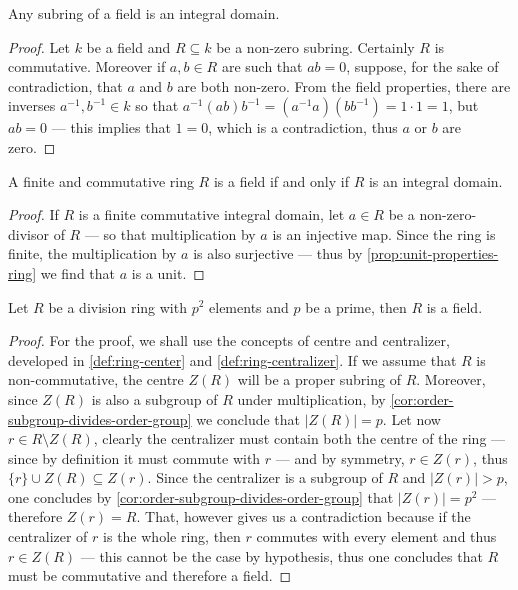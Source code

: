 %
\begin{proposition}
    \label{prop:subring-field-is-integral-domain}
    Any subring of a field is an integral domain.
\end{proposition}
%

%
\begin{proof}
    Let \(k\) be a field and \(R \subseteq k\) be a non-zero subring. Certainly
    \(R\) is commutative. Moreover if \(a, b \in R\) are such that \(a b = 0\),
    suppose, for the sake of contradiction, that \(a\) and \(b\) are both
    non-zero. From the field properties, there are inverses \(a^{-1}, b^{-1} \in k\)
    so that \(a^{-1}(a b) b^{-1} = (a^{-1} a) (b b^{-1}) = 1 \cdot 1 = 1\), but \(a
    b = 0\) --- this implies that \(1 = 0\), which is a contradiction, thus \(a\) or
    \(b\) are zero.
\end{proof}
%

%
\begin{proposition}
    \label{prop:commutative-field-iff-integral-domain}
    A finite and commutative ring \(R\) is a field if and only if \(R\) is an
    integral domain.
\end{proposition}
%

%
\begin{proof}
    If \(R\) is a finite commutative integral domain, let \(a \in R\) be a
    non-zero-divisor of \(R\) --- so that multiplication by \(a\) is an injective
    map. Since the ring is finite, the multiplication by \(a\) is also surjective
    --- thus by \cref{prop:unit-properties-ring} we find that \(a\) is a unit.
\end{proof}
%

%
\begin{proposition}
    \label{prop:division-ring-p2-elements-commutative}
    Let \(R\) be a division ring with \(p^2\) elements and \(p\) be a prime,
    then \(R\) is a field.
\end{proposition}
%

%
\begin{proof}
    For the proof, we shall use the concepts of centre and centralizer, developed in
    \cref{def:ring-center} and \cref{def:ring-centralizer}. If we assume that \(R\)
    is non-commutative, the centre \(Z(R)\) will be a proper subring of
    \(R\). Moreover, since \(Z(R)\) is also a subgroup of \(R\) under
    multiplication, by \cref{cor:order-subgroup-divides-order-group} we conclude
    that \(|Z(R)| = p\). Let now \(r \in R \setminus Z(R)\), clearly the centralizer
    must contain both the centre of the ring --- since by definition it must commute
    with \(r\) --- and by symmetry, \(r \in Z(r)\), thus
    \(\{r\} \cup Z(R) \subseteq Z(r)\). Since the centralizer is a subgroup of \(R\)
    and \(|Z(r)| > p\), one concludes by
    \cref{cor:order-subgroup-divides-order-group} that \(|Z(r)| = p^2\) ---
    therefore \(Z(r) = R\). That, however gives us a contradiction because if the
    centralizer of \(r\) is the whole ring, then \(r\) commutes with every element
    and thus \(r \in Z(R)\) --- this cannot be the case by hypothesis, thus one
    concludes that \(R\) must be commutative and therefore a field.
\end{proof}
%

